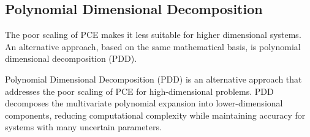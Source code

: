\subsection{Polynomial Dimensional Decomposition}
The poor scaling of PCE makes it less suitable for higher dimensional systems. An alternative approach, based on the
same mathematical basis, is polynomial dimensional decomposition (PDD). 

Polynomial Dimensional Decomposition (PDD) is an alternative approach that addresses the poor scaling of PCE for high-dimensional problems. PDD decomposes the multivariate polynomial expansion into lower-dimensional components, reducing computational complexity while maintaining accuracy for systems with many uncertain parameters.
